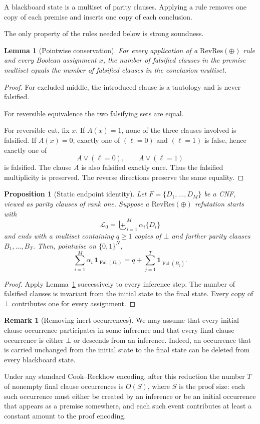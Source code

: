 \documentclass[11pt]{article}
\newtheorem{lemma}[theorem]{Lemma}
\newtheorem{proposition}[theorem]{Proposition}
\theoremstyle{definition}
\newtheorem{remark}[theorem]{Remark}
\newcommand{\bits}{\{0,1\}}
\newcommand{\RevRes}{\mathrm{RevRes}}
\newcommand{\Fal}{\operatorname{Fal}}
\begin{document}
A blackboard state is a multiset of parity clauses.  Applying a rule removes one copy
of each premise and inserts one copy of each conclusion.

The only property of the rules needed below is strong soundness.

\begin{lemma}[Pointwise conservation]\label{lem:strong-soundness}
For every application of a $\RevRes(\oplus)$ rule and every Boolean assignment $x$,
the number of falsified clauses in the premise multiset equals the number of falsified
clauses in the conclusion multiset.
\end{lemma}

\begin{proof}
For excluded middle, the introduced clause is a tautology and is never falsified.

For reversible equivalence the two falsifying sets are equal.

For reversible cut, fix $x$.  If $A(x)=1$, none of the three clauses involved is
falsified.  If $A(x)=0$, exactly one of $(\ell=0)$ and $(\ell=1)$ is false, hence
exactly one of
\[
  A\vee(\ell=0),\qquad A\vee(\ell=1)
\]
is falsified.  The clause $A$ is also falsified exactly once.  Thus the falsified
multiplicity is preserved.  The reverse directions preserve the same equality.
\end{proof}

\begin{proposition}[Static endpoint identity]\label{prop:static}
Let $F=\{D_1,\dots,D_M\}$ be a CNF, viewed as parity clauses of rank one.
Suppose a $\RevRes(\oplus)$ refutation starts with
\[
  \mathcal L_0=\biguplus_{i=1}^M \alpha_i\{D_i\}
\]
and ends with a multiset containing $q\ge 1$ copies of $\bot$ and further parity
clauses $B_1,\dots,B_T$.  Then, pointwise on $\bits^N$,
\[
  \sum_{i=1}^M \alpha_i\,\mathbf 1_{\Fal(D_i)}
  =
  q+\sum_{j=1}^T\mathbf 1_{\Fal(B_j)}.
  \tag{2.1}\label{eq:static}
\]
\end{proposition}

\begin{proof}
Apply Lemma~\ref{lem:strong-soundness} successively to every inference step.
The number of falsified clauses is invariant from the initial state to the final
state.  Every copy of $\bot$ contributes one for every assignment.
\end{proof}

\begin{remark}[Removing inert occurrences]\label{rem:inert}
We may assume that every initial clause occurrence participates in some inference and
that every final clause occurrence is either $\bot$ or descends from an inference.
Indeed, an occurrence that is carried unchanged from the initial state to the final
state can be deleted from every blackboard state.

Under any standard Cook--Reckhow encoding, after this reduction the number $T$ of
nonempty final clause occurrences is $O(S)$, where $S$ is the proof size: each such
occurrence must either be created by an inference or be an initial occurrence that
appears as a premise somewhere, and each such event contributes at least a constant
amount to the proof encoding.
\end{remark}
\end{document}
